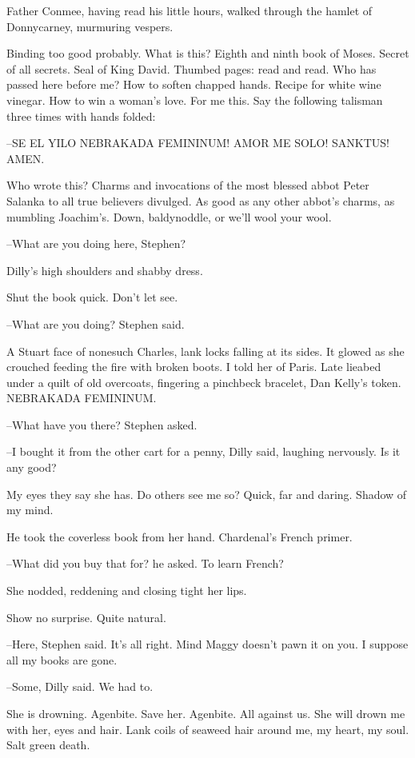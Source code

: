 Father Conmee, having read his little hours,
walked through the hamlet of
Donnycarney,
murmuring vespers.

Binding too good probably.
What is this?
Eighth and ninth book of Moses.
Secret of all secrets.
Seal of King David.
Thumbed pages: read and read.
Who has passed here before me?
How to soften chapped hands.
Recipe for
white wine vinegar.
How to win a woman's love.
For me this.
Say the
following talisman three times with hands folded:

--SE EL YILO NEBRAKADA FEMININUM!
AMOR ME SOLO!
SANKTUS!
AMEN.

Who wrote this?
Charms and invocations of the most blessed abbot Peter Salanka
to all true believers divulged.
As good as any other abbot's
charms,
as mumbling Joachim's.
Down, baldynoddle, or we'll wool your
wool.

--What are you doing here, Stephen?

Dilly's high shoulders and shabby dress.

Shut the book quick.
Don't let see.

--What are you doing?
Stephen said.

A Stuart face of nonesuch Charles,
lank locks falling at its sides.
It glowed as she crouched
feeding the fire with broken boots.
I told her of Paris.
Late lieabed under a quilt of old overcoats,
fingering a pinchbeck bracelet,
Dan Kelly's token.
NEBRAKADA FEMININUM.

--What have you there?
Stephen asked.

--I bought it from the other cart for a penny,
Dilly said,
laughing
nervously.
Is it any good?

My eyes they say she has.
Do others see me so?
Quick, far and daring.
Shadow of my mind.

He took the coverless book from her hand.
Chardenal's French primer.

--What did you buy that for?
he asked.
To learn French?

She nodded,
reddening and closing tight her lips.

Show no surprise. Quite natural.

--Here,
Stephen said.
It's all right.
Mind Maggy doesn't pawn it on you.
I suppose all my books are gone.

--Some,
Dilly said.
We had to.

She is drowning.
Agenbite.
Save her.
Agenbite.
All against us.
She will
drown me with her,
eyes and hair.
Lank coils of seaweed hair around me,
my heart, my soul.
Salt green death.

